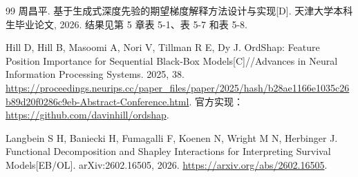 \begin{thebibliography}{99}
周昌平. 基于生成式深度先验的期望梯度解释方法设计与实现[D]. 天津大学本科生毕业论文, 2026. 结果见第 5 章表 5-1、表 5-7 和表 5-8.

Hill D, Hill B, Masoomi A, Nori V, Tillman R E, Dy J. OrdShap: Feature Position Importance for Sequential Black-Box Models[C]//Advances in Neural Information Processing Systems. 2025, 38. \url{https://proceedings.neurips.cc/paper_files/paper/2025/hash/b28ae1166e1035c26b89d20f0286c9eb-Abstract-Conference.html}. 官方实现：\url{https://github.com/davinhill/ordshap}.

Langbein S H, Baniecki H, Fumagalli F, Koenen N, Wright M N, Herbinger J. Functional Decomposition and Shapley Interactions for Interpreting Survival Models[EB/OL]. arXiv:2602.16505, 2026. \url{https://arxiv.org/abs/2602.16505}.

\end{thebibliography}
